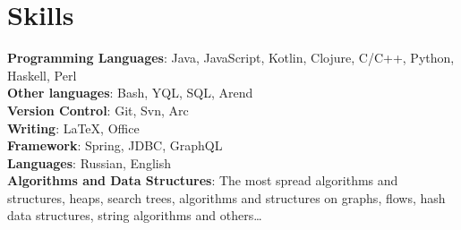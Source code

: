 \documentclass[letterpaper,10pt]{article}
\begin{document}
\section{Skills}
 \begin{itemize}[leftmargin=0.15in, label={}]
    \small{\item{
     \textbf{Programming Languages}{: Java, JavaScript, Kotlin, Clojure, C/C++, Python, Haskell, Perl} \\
     \textbf{Other languages}{: Bash, YQL, SQL, Arend}\\
     \textbf{Version Control}{: Git, Svn, Arc} \\
     \textbf{Writing}{: \LaTeX, Office} \\
     \textbf{Framework}{: Spring, JDBC, GraphQL} \\
     \textbf{Languages}{: Russian, English} \\
     \textbf{Algorithms and Data Structures}{: The most spread algorithms and structures, heaps, search trees, algorithms and structures on graphs, flows, hash data structures, string algorithms and others\dots} \\
    }}
 \end{itemize}
\end{document}
